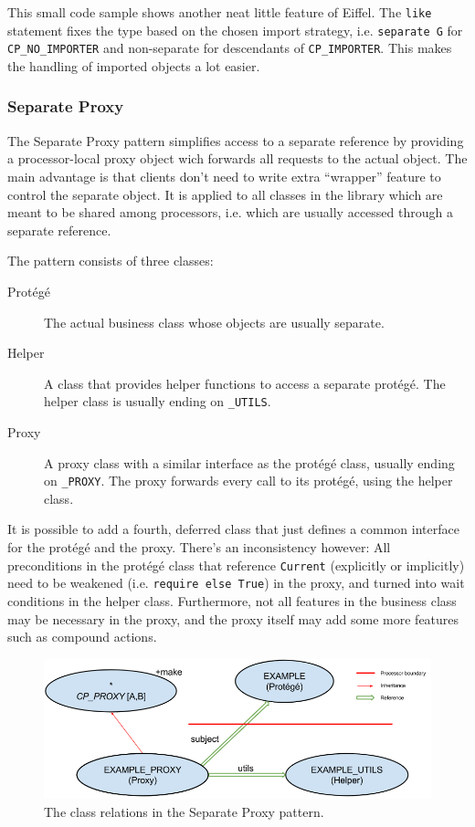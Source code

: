 \documentclass[a4paper,10pt,titlepage]{article}
\begin{document}
This small code sample shows another neat little feature of Eiffel.
The \lstinline!like! statement fixes the type based on the chosen import strategy, i.e. \lstinline!separate G! for \lstinline!CP_NO_IMPORTER! and non-separate for descendants of \lstinline!CP_IMPORTER!.
This makes the handling of imported objects a lot easier.

\subsubsection{Separate Proxy}
\label{sec:separate-proxy}

The Separate Proxy pattern  simplifies access to a separate reference by providing a processor-local proxy object wich forwards all requests to the actual object.
The main advantage is that clients don't need to write extra ``wrapper'' feature to control the separate object.
It is applied to all classes in the library which are meant to be shared among processors, i.e. which are usually accessed through a separate reference.

The pattern consists of three classes:
\begin{description}
 \item [Protégé] The actual business class whose objects are usually separate.
 \item [Helper] A class that provides helper functions to access a separate protégé.
  The helper class is usually ending on \lstinline!_UTILS!.
 \item [Proxy] A proxy class with a similar interface as the protégé class, usually ending on \lstinline!_PROXY!.
    The proxy forwards every call to its protégé, using the helper class.
\end{description}

It is possible to add a fourth, deferred class that just defines a common interface for the protégé and the proxy.
There's an inconsistency however: 
All preconditions in the protégé class that reference \lstinline!Current! (explicitly or implicitly) need to be weakened (i.e. \lstinline!require else True!) in the proxy, and turned into wait conditions in the helper class.
Furthermore, not all features in the business class may be necessary in the proxy, and the proxy itself may add some more features such as compound actions.

\begin{figure}[h]
\label{fig:separate-proxy}
\includegraphics[width=\textwidth]{separate_proxy.png}
\caption{The class relations in the Separate Proxy pattern.}
\end{figure}
\end{document}
